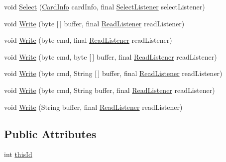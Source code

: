 \begin{DoxyCompactItemize}
\item 
void \mbox{\hyperlink{classcom_1_1ethernom_1_1android_1_1etherapi_1_1_ether_a_p_i_a12e73d4fe631c9817166a1a16ee05949}{Select}} (\mbox{\hyperlink{classcom_1_1ethernom_1_1android_1_1etherapi_1_1_card_info}{Card\+Info}} card\+Info, final \mbox{\hyperlink{interfacecom_1_1ethernom_1_1android_1_1etherapi_1_1_select_listener}{Select\+Listener}} select\+Listener)
\item 
void \mbox{\hyperlink{classcom_1_1ethernom_1_1android_1_1etherapi_1_1_ether_a_p_i_a00dfeb101d51c8b28b2f11d7bdf5f84c}{Write}} (byte \mbox{[}$\,$\mbox{]} buffer, final \mbox{\hyperlink{interfacecom_1_1ethernom_1_1android_1_1etherapi_1_1_read_listener}{Read\+Listener}} read\+Listener)
\item 
void \mbox{\hyperlink{classcom_1_1ethernom_1_1android_1_1etherapi_1_1_ether_a_p_i_aa812a2cc15c8b51c541b128b773c864f}{Write}} (byte cmd, final \mbox{\hyperlink{interfacecom_1_1ethernom_1_1android_1_1etherapi_1_1_read_listener}{Read\+Listener}} read\+Listener)
\item 
void \mbox{\hyperlink{classcom_1_1ethernom_1_1android_1_1etherapi_1_1_ether_a_p_i_a404cbb6c5364773e3c97e86192e1762d}{Write}} (byte cmd, byte \mbox{[}$\,$\mbox{]} buffer, final \mbox{\hyperlink{interfacecom_1_1ethernom_1_1android_1_1etherapi_1_1_read_listener}{Read\+Listener}} read\+Listener)
\item 
void \mbox{\hyperlink{classcom_1_1ethernom_1_1android_1_1etherapi_1_1_ether_a_p_i_abe97e3ee72cd97fb6c210a907e1bfcaa}{Write}} (byte cmd, String \mbox{[}$\,$\mbox{]} buffer, final \mbox{\hyperlink{interfacecom_1_1ethernom_1_1android_1_1etherapi_1_1_read_listener}{Read\+Listener}} read\+Listener)
\item 
void \mbox{\hyperlink{classcom_1_1ethernom_1_1android_1_1etherapi_1_1_ether_a_p_i_a397b87cd1ab2b0d151289e39b8b2f16c}{Write}} (byte cmd, String buffer, final \mbox{\hyperlink{interfacecom_1_1ethernom_1_1android_1_1etherapi_1_1_read_listener}{Read\+Listener}} read\+Listener)
\item 
void \mbox{\hyperlink{classcom_1_1ethernom_1_1android_1_1etherapi_1_1_ether_a_p_i_a11ed9e46f15a79e2221577a7b1cd68ab}{Write}} (String buffer, final \mbox{\hyperlink{interfacecom_1_1ethernom_1_1android_1_1etherapi_1_1_read_listener}{Read\+Listener}} read\+Listener)
\end{DoxyCompactItemize}
\subsection*{Public Attributes}
\begin{DoxyCompactItemize}
\item 
int \mbox{\hyperlink{classcom_1_1ethernom_1_1android_1_1etherapi_1_1_ether_a_p_i_a4eb73235f8638afdb798f4351a885951}{this\+Id}}
\end{DoxyCompactItemize}
